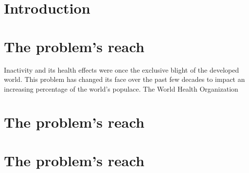 \documentclass[12pt,article]{IEEEtran}
\begin{document}
	
		 
	\section{Introduction}

	\section{The problem's reach}
		 Inactivity and its health effects were once the exclusive blight of 
		the developed world. This problem has changed its face over the past few decades to impact an 
		increasing percentage of the world's populace. The World Health Organization  
		\cite{ab94}
	\section{The problem's reach}

	\section{The problem's reach}




\end{document}
